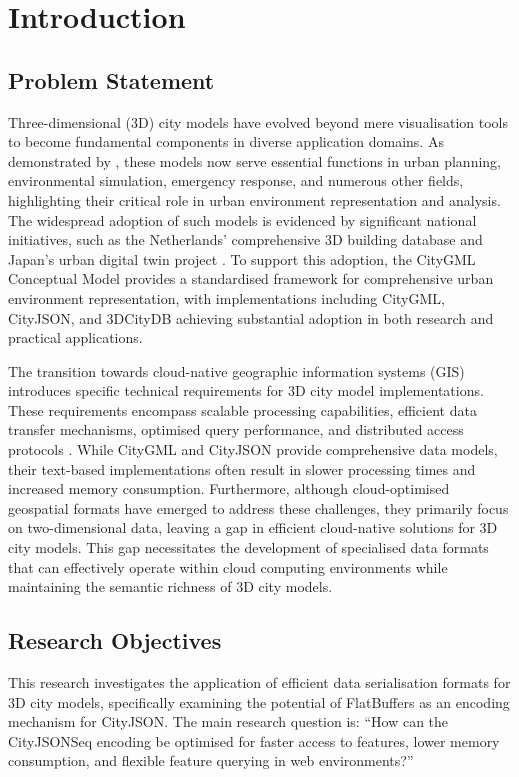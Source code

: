 
\chapter{Introduction}%
\label{introduction}

\section{Problem Statement}
\label{introduction:problem_statement}
Three-dimensional (3D) city models have evolved beyond mere visualisation tools to become fundamental components in diverse application domains. As demonstrated by \citet{biljecki_2015}, these models now serve essential functions in urban planning, environmental simulation, emergency response, and numerous other fields, highlighting their critical role in urban environment representation and analysis. The widespread adoption of such models is evidenced by significant national initiatives, such as the Netherlands' comprehensive 3D building database \citep{3dbag} and Japan's urban digital twin project \citep{plateau}. To support this adoption, the CityGML Conceptual Model \citep{CityGML} provides a standardised framework for comprehensive urban environment representation, with implementations including CityGML, CityJSON, and 3DCityDB achieving substantial adoption in both research and practical applications.

The transition towards cloud-native geographic information systems (GIS) introduces specific technical requirements for 3D city model implementations. These requirements encompass scalable processing capabilities, efficient data transfer mechanisms, optimised query performance, and distributed access protocols \citep{cloud-optimised-formats}. While CityGML and CityJSON provide comprehensive data models, their text-based implementations often result in slower processing times and increased memory consumption. Furthermore, although cloud-optimised geospatial formats have emerged to address these challenges, they primarily focus on two-dimensional data, leaving a gap in efficient cloud-native solutions for 3D city models. This gap necessitates the development of specialised data formats that can effectively operate within cloud computing environments while maintaining the semantic richness of 3D city models.

\section{Research Objectives}
\label{introduction:research_objectives}
This research investigates the application of efficient data serialisation formats for 3D city models, specifically examining the potential of FlatBuffers \citep{flatbuffers} as an encoding mechanism for CityJSON.
The main research question is:
``How can the CityJSONSeq encoding be optimised for faster access to features, lower memory consumption, and flexible feature querying in web environments?''

